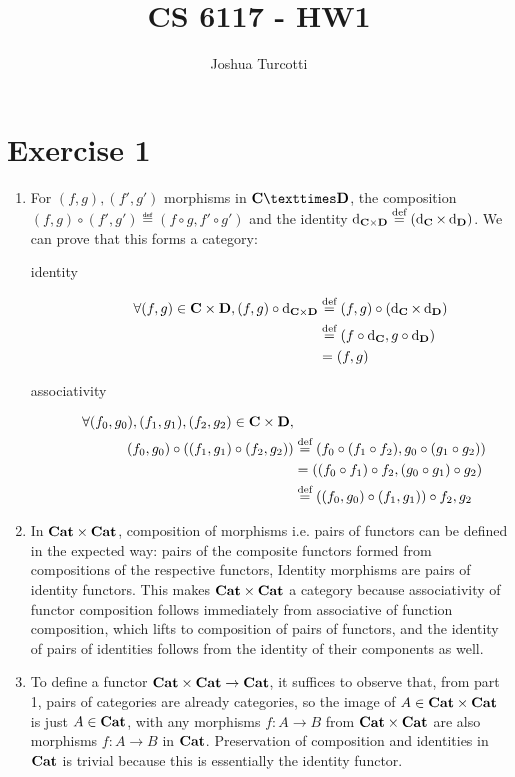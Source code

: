 \documentclass{article}
\title{CS 6117 - HW1}
\author{Joshua Turcotti}
\begin{document}
\maketitle

\section*{Exercise 1}

\newcommand{\catCD}{\catC \times \catD}

\begin{enumerate}
\item 
  For $(f, g), (f', g')$ morphisms in $\catC × \catD$, the composition $(f, g) \circ (f', g') \eqdef (f \circ g, f' \circ g')$ and the identity $\operatorname{d}_{\mathbf{C} \times \mathbf{D}} \stackrel{\text{def}}{=} (\operatorname{d}_{\mathbf{C}} \times \operatorname{d}_{\mathbf{D}})$. We can prove that this forms a category:
  \begin{description}
  \item[identity]
    \begin{align*}
      \forall (f, g) \in \catCD, (f, g) \circ \id_{\catCD} &\eqdef (f, g) \circ (\id_\catC \times \id_\catD)\\
                                                           &\eqdef (f \circ \id_\catC, g \circ \id_\catD) \\
                                                           &= (f, g)
    \end{align*}
  \item[associativity]
    \begin{align*}
      \forall(f_0, g_0), (f_1, g_1), (f_2, g_2) \in \catCD, \\
      (f_0, g_0) \circ ((f_1, g_1) \circ (f_2, g_2)) & \eqdef (f_0 \circ (f_1 \circ f_2), g_0 \circ (g_1 \circ g_2))\\
                                                     &= ((f_0 \circ f_1) \circ f_2, (g_0 \circ g_1) \circ g_2) \\
                                                     &\eqdef ((f_0, g_0) \circ (f_1, g_1)) \circ f_2, g_2
    \end{align*}
  \end{description}
\item
  In $\mathbf{Cat} \times \mathbf{Cat}$, composition of morphisms i.e. pairs of functors can be defined in the expected way: pairs of the composite functors formed from compositions of the respective functors, Identity morphisms are pairs of identity functors. This makes $\mathbf{Cat} \times \mathbf{Cat}$ a category because associativity of functor composition follows immediately from associative of function composition, which lifts to composition of pairs of functors, and the identity of pairs of identities follows from the identity of their components as well.
\item
  To define a functor $\mathbf{Cat} \times \mathbf{Cat} \to \mathbf{Cat}$, it suffices to observe that, from part 1, pairs of categories are already categories, so the image of $A \in \mathbf{Cat} \times \mathbf{Cat}$ is just $A \in \mathbf{Cat}$, with any morphisms $f : A \to B$ from $\mathbf{Cat} \times \mathbf{Cat}$ are also morphisms $f: A \to B$ in $\mathbf{Cat}$. Preservation of composition and identities in $\mathbf{Cat}$ is trivial because this is essentially the identity functor.
\end{enumerate}
\end{document}
